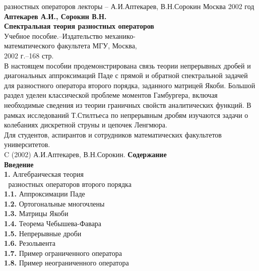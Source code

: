 \documentclass[12 pt, a4 paper]{article}
\theoremstyle{plain}   \newtheorem{Pro}{Задача}
\begin{document}
{ разностных операторов}
{лекторы --  А.И.Аптекарев, В.Н.Сорокин}
{}
{Москва 2002 год}
\newpage
$$ \; $$
{\bfseries Аптекарев А.И., Сорокин В.Н.}
$$ \; $$
$$ \; $$
{\bfseries Спектральная теория разностных операторов}
$$ \; $$
Учебное пособие.--Издательство механико- \\
математического факультета МГУ, Москва, \\
2002 г.--168 стр.
$$ \; $$
В настоящем пособии продемонстрирована связь теории непрерывных
дробей и диагональных аппроксимаций Паде с прямой и обратной
спектральной задачей для разностного оператора второго порядка,
заданного матрицей Якоби. Большой раздел уделен классической
проблеме моментов Гамбургера, включая необходимые сведения из
теории граничных свойств аналитических функций. В рамках
исследований Т.Стилтьеса по непрерывным дробям изучаются
задачи о колебаниях дискретной струны и цепочек Ленгмюра. \\
Для студентов, аспирантов и сотрудников математических
факультетов университетов.
\vspace{4 cm}\\
C (2002) А.И.Аптекарев, В.Н.Сорокин.
\newpage
{\Large \bfseries Содержание}
$$ \; $$
{\bfseries Введение}
$$ \; $$
{\Large \bfseries 1.}
Алгебраическая теория \\
$ \; $ разностных операторов второго порядка \\
{\bfseries 1.1.}
Аппроксимации Паде \\
{\bfseries 1.2.}
Ортогональные многочлены \\
{\bfseries 1.3.}
Матрицы Якоби \\
{\bfseries 1.4.}
Теорема Чебышева-Фавара \\
{\bfseries 1.5.}
Непрерывные дроби \\
{\bfseries 1.6.}
Резольвента \\
{\bfseries 1.7.}
Пример ограниченного оператора \\
{\bfseries 1.8.}
Пример неограниченного оператора \\
\end{document}
